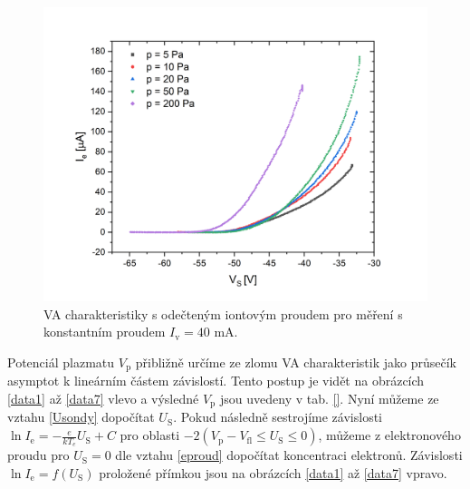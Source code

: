 \documentclass[a4paper,12pt]{article}
\begin{document}
\begin{figure}[h]
	\centering
	\includegraphics[width=145mm]{odectene34567.png}
	\caption{VA charakteristiky s odečteným iontovým proudem pro měření s konstantním proudem $I_\text{v} = 40$ \si{\milli\ampere}.}
	\label{odectene34567}
\end{figure}

Potenciál plazmatu $V_\text{p}$ přibližně určíme ze zlomu VA charakteristik jako průsečík asymptot k lineárním částem závislostí. Tento postup je vidět na obrázcích \ref{data1} až \ref{data7} vlevo a výsledné $V_\text{p}$ jsou uvedeny v tab. \ref{}. Nyní můžeme ze vztahu \ref{Usondy} dopočítat $U_\text{S}$. Pokud následně sestrojíme závislosti $\ln I_{\text{e}} = -\frac{e}{kT_e}U_\text{S} + C$ pro oblasti $-2(V_\text{p} - V_\text{{fl}} \leq U_\text{S} \leq 0)$, můžeme z elektronového proudu pro $U_\text{S} = 0$ dle vztahu \ref{eproud} dopočítat koncentraci elektronů. Závislosti $\ln I_{\text{e}} = f(U_\text{S})$ proložené přímkou jsou na obrázcích \ref{data1} až \ref{data7} vpravo.
\end{document}
